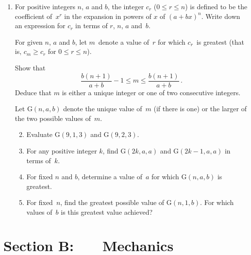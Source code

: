 \documentclass[a4, 11pt]{report}
\newlength{\qspace}
\newcounter{qnumber}
\newenvironment{question}%
 {\vspace{\qspace}
  \begin{enumerate}[\bfseries 1\quad][10]%
    \setcounter{enumi}{\value{qnumber}}%
    \item%
 }
{
  \end{enumerate}
  \filbreak
  \stepcounter{qnumber}
 }
\newenvironment{questionparts}[1][1]%
 {
  \begin{enumerate}[\bfseries (i)]%
    \setcounter{enumii}{#1}
    \addtocounter{enumii}{-1}
    \setlength{\itemsep}{5mm}
    \setlength{\parskip}{8pt}
 }
 {
  \end{enumerate}
 }
\def\le{\leqslant}
\def\ge{\geqslant}
\renewcommand{\.}[1]{\ensuremath{\mathrm{#1}}}
\newcommand{\+}[1]{\ensuremath{\mathbf{#1}}}
\begin{document}
\begin{question}
For positive integers $n$, $a$ and $b$, the integer $c_r$
  ($0\le r\le n$) is defined to be the coefficient of~$x^r$ in the
  expansion in powers of $x$ of $(a+bx)^n$. Write down an expression
  for $c_r$ in terms of $r$, $n$, $a$ and~$b$.

  For given $n$, $a$ and $b$, let $m$~denote a value of~$r$ for which
  $c_r$~is greatest (that is, $c_m \ge c_r$ for $0\le r\le n$).

  Show that
  \[
  \frac{b(n+1)}{a+b} - 1 \le m \le \frac {b(n+1)}{a+b} \,.
  \]
  Deduce that $m$ is either a unique integer or one of 
  two consecutive integers.

Let  $\.G(n,a,b)$ denote the unique value
  of~$m$ (if there is one) or
 the larger of the two possible values of~$m$.

  \begin{questionparts}
  \item Evaluate $\.G(9,1,3)$ and $\.G(9,2,3)$.
  \item For any positive integer $k$,
   find $\.G(2k,a,a)$ and $\.G(2k-1,a,a)$ in terms of~$k$.
  \item For fixed $n$ and $b$, determine a value of~$a$ for which
    $\.G(n,a,b)$ is greatest.
  \item For fixed~$n$, find the greatest possible value of
    $\.G(n,1,b)$. For which  values of~$b$ is  this
    greatest value achieved?
  \end{questionparts}
\end{question}	
		

		
	
\newpage
\section*{Section B: \ \ \ Mechanics}
\end{document}
